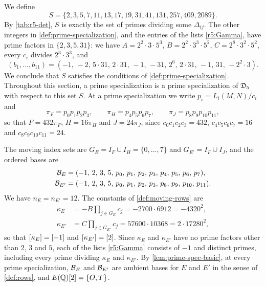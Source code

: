 We define
\begin{equation}\label{r5:S}
S=\{2,3,5,7,11,13,17,19,31,41,131,257,409,2089\}.
\end{equation}
By \cref{tab:r5-det}, $S$ is exactly the set of primes dividing some $\Delta_{ij}$. The other integers in \cref{def:prime-specialization}, and the entries of the lists \eqref{r5:Gamma}, have prime factors in $\{2,3,5,31\}$: we have $A=2^2\cdot3\cdot5^3$, $B=2^2\cdot3^3\cdot5^2$, $C=2^8\cdot3^2\cdot5^2$, every $c_i$ divides $2^3\cdot3^3$, and
\[
(b_1,\dots,b_{11})=(-1,\,-2,\,5\cdot31,\,2\cdot31,\,-1,\,-31,\,2^6,\,2\cdot31,\,-1,\,31,\,-2^2\cdot3).
\]
We conclude that $S$ satisfies the conditions of \cref{def:prime-specialization}. Throughout this section, a prime specialization is a prime specialization of $\mathfrak D_5$ with respect to this set $S$. At a prime specialization we write $p_i=L_i(M,N)/c_i$ and
\begin{equation}\label{r5:PFHJ}
\pi_F=p_0p_1p_2p_3,\qquad \pi_H=p_4p_5p_6p_7,\qquad \pi_J=p_8p_9p_{10}p_{11},
\end{equation}
so that $F=432\pi_F$, $H=16\pi_H$ and $J=24\pi_J$, since $c_0c_1c_2c_3=432$, $c_4c_5c_6c_7=16$ and $c_8c_9c_{10}c_{11}=24$.

The moving index sets are $G_E=I_F\cup I_H=\{0,\dots,7\}$ and $G_{E'}=I_F\cup I_J$, and the ordered bases are
\begin{equation}\label{r5:bases}
\begin{aligned}
\mathcal B_E&=(-1,\,2,\,3,\,5,\,p_0,\,p_1,\,p_2,\,p_3,\,p_4,\,p_5,\,p_6,\,p_7),\\
\mathcal B_{E'}&=(-1,\,2,\,3,\,5,\,p_0,\,p_1,\,p_2,\,p_3,\,p_8,\,p_9,\,p_{10},\,p_{11}).
\end{aligned}
\end{equation}
We have $n_E=n_{E'}=12$. The constants of \cref{def:moving-rows} are
\begin{equation}\label{r5:kappa}
\begin{aligned}
\kappa_E&=-B\prod_{j\in G_E}c_j=-2700\cdot6912=-4320^2,\\
\kappa_{E'}&=C\prod_{j\in G_{E'}}c_j=57600\cdot10368=2\cdot17280^2,
\end{aligned}
\end{equation}
so that $[\kappa_E]=[-1]$ and $[\kappa_{E'}]=[2]$. Since $\kappa_E$ and $\kappa_{E'}$ have no prime factors other than $2$, $3$ and $5$, each of the lists \eqref{r5:Gamma} consists of $-1$ and distinct primes, including every prime dividing $\kappa_E$ and $\kappa_{E'}$. By \cref{lem:prime-spec-basic}, at every prime specialization, $\mathcal B_E$ and $\mathcal B_{E'}$ are ambient bases for $E$ and $E'$ in the sense of \cref{def:rows}, and $E(\mathbb Q)[2]=\{O,T\}$.

